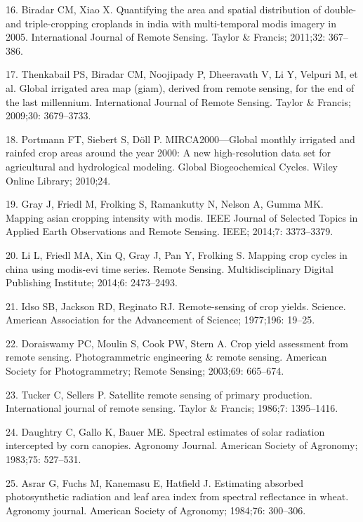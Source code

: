 \documentclass[]{elsarticle} %
\begin{document}
\hypertarget{ref-biradar2011quantifying}{}
16. Biradar CM, Xiao X. Quantifying the area and spatial distribution of
double-and triple-cropping croplands in india with multi-temporal modis
imagery in 2005. International Journal of Remote Sensing. Taylor \&
Francis; 2011;32: 367--386.

\hypertarget{ref-thenkabail2009global}{}
17. Thenkabail PS, Biradar CM, Noojipady P, Dheeravath V, Li Y, Velpuri
M, et al. Global irrigated area map (giam), derived from remote sensing,
for the end of the last millennium. International Journal of Remote
Sensing. Taylor \& Francis; 2009;30: 3679--3733.

\hypertarget{ref-portmann2010mirca2000}{}
18. Portmann FT, Siebert S, Döll P. MIRCA2000---Global monthly irrigated
and rainfed crop areas around the year 2000: A new high-resolution data
set for agricultural and hydrological modeling. Global Biogeochemical
Cycles. Wiley Online Library; 2010;24.

\hypertarget{ref-gray2014mapping}{}
19. Gray J, Friedl M, Frolking S, Ramankutty N, Nelson A, Gumma MK.
Mapping asian cropping intensity with modis. IEEE Journal of Selected
Topics in Applied Earth Observations and Remote Sensing. IEEE; 2014;7:
3373--3379.

\hypertarget{ref-li2014mapping}{}
20. Li L, Friedl MA, Xin Q, Gray J, Pan Y, Frolking S. Mapping crop
cycles in china using modis-evi time series. Remote Sensing.
Multidisciplinary Digital Publishing Institute; 2014;6: 2473--2493.

\hypertarget{ref-idso1977remote}{}
21. Idso SB, Jackson RD, Reginato RJ. Remote-sensing of crop yields.
Science. American Association for the Advancement of Science; 1977;196:
19--25.

\hypertarget{ref-doraiswamy2003crop}{}
22. Doraiswamy PC, Moulin S, Cook PW, Stern A. Crop yield assessment
from remote sensing. Photogrammetric engineering \& remote sensing.
American Society for Photogrammetry; Remote Sensing; 2003;69: 665--674.

\hypertarget{ref-tucker1986satellite}{}
23. Tucker C, Sellers P. Satellite remote sensing of primary production.
International journal of remote sensing. Taylor \& Francis; 1986;7:
1395--1416.

\hypertarget{ref-daughtry1983spectral}{}
24. Daughtry C, Gallo K, Bauer ME. Spectral estimates of solar radiation
intercepted by corn canopies. Agronomy Journal. American Society of
Agronomy; 1983;75: 527--531.

\hypertarget{ref-asrar1984estimating}{}
25. Asrar G, Fuchs M, Kanemasu E, Hatfield J. Estimating absorbed
photosynthetic radiation and leaf area index from spectral reflectance
in wheat. Agronomy journal. American Society of Agronomy; 1984;76:
300--306.
\end{document}

